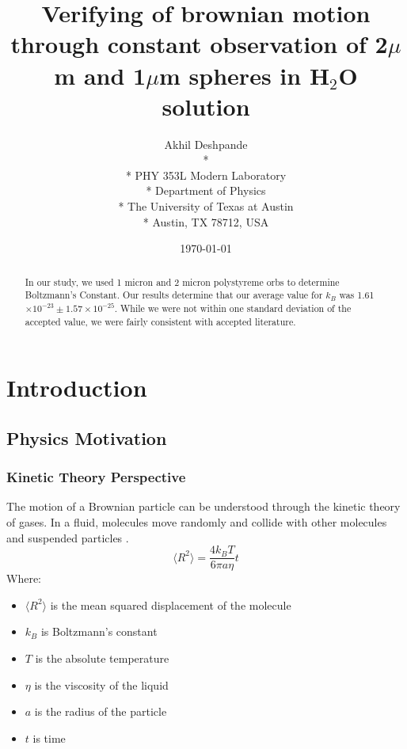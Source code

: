 \documentclass[10pt,letterpaper,onecolumn]{article}
\begin{document}
\title{Verifying of brownian motion through constant observation of 2$\mu$m and 1$\mu$m spheres in H$_2$O solution }


\author{
 Akhil Deshpande \\*
  \\*
 PHY 353L Modern Laboratory \\*
 Department of Physics \\*
 The University of Texas at Austin \\*
 Austin, TX 78712, USA
}
\date{\today}

\maketitle

\begin{abstract}
    In our study, we used 1 micron and 2 micron polystyreme orbs to determine Boltzmann's Constant.
Our results determine that our average value for $k_B$ was 1.61$\times10^{-23} \pm 1.57\times10^{-25}$. While we were not within one standard deviation of the accepted value, we were fairly consistent with accepted literature.
    
\end{abstract}


\section{Introduction}
\subsection{Physics Motivation}
\subsubsection{Kinetic Theory Perspective}
The motion of a Brownian particle can be understood through the kinetic theory of gases. In a fluid, molecules move randomly and collide with other molecules and suspended particles \cite{brown1828}.
\begin{equation}
\langle R^2 \rangle = \frac{4k_BT}{6\pi a \eta}t
\end{equation}
\newpage
Where:
\begin{itemize}
    \item $\langle R^2 \rangle$ is the mean squared displacement of the molecule
    \item $k_B$ is Boltzmann's constant
    \item $T$ is the absolute temperature
    \item $\eta$ is the viscosity of the liquid
    \item $a$ is the radius of the particle
    \item $t$ is time
\end{itemize}
\end{document}
